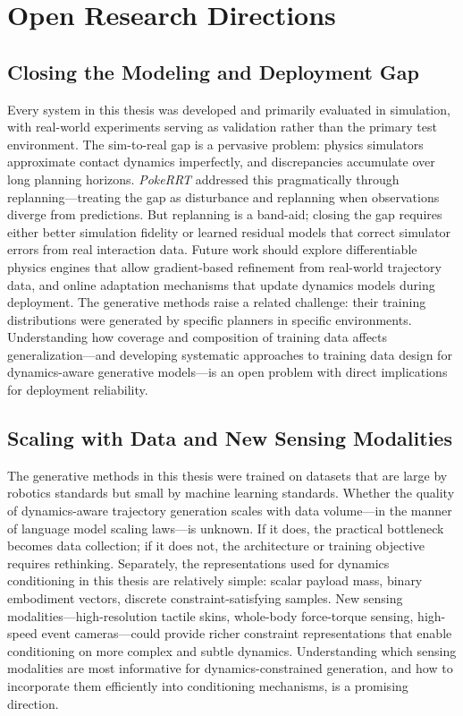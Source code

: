 
\section{Open Research Directions}
\label{sec:discussion:threads}

\subsection{Closing the Modeling and Deployment Gap}
\label{sec:discussion:modeling}

Every system in this thesis was developed and primarily evaluated in simulation, with real-world experiments serving as validation rather than the primary test environment.
The sim-to-real gap is a pervasive problem: physics simulators approximate contact dynamics imperfectly, and discrepancies accumulate over long planning horizons.
\textit{PokeRRT} addressed this pragmatically through replanning---treating the gap as disturbance and replanning when observations diverge from predictions.
But replanning is a band-aid; closing the gap requires either better simulation fidelity or learned residual models that correct simulator errors from real interaction data.
Future work should explore differentiable physics engines that allow gradient-based refinement from real-world trajectory data, and online adaptation mechanisms that update dynamics models during deployment.
The generative methods raise a related challenge: their training distributions were generated by specific planners in specific environments.
Understanding how coverage and composition of training data affects generalization---and developing systematic approaches to training data design for dynamics-aware generative models---is an open problem with direct implications for deployment reliability.

\subsection{Scaling with Data and New Sensing Modalities}
\label{sec:discussion:datascaling}

The generative methods in this thesis were trained on datasets that are large by robotics standards but small by machine learning standards.
Whether the quality of dynamics-aware trajectory generation scales with data volume---in the manner of language model scaling laws---is unknown.
If it does, the practical bottleneck becomes data collection; if it does not, the architecture or training objective requires rethinking.
Separately, the representations used for dynamics conditioning in this thesis are relatively simple: scalar payload mass, binary embodiment vectors, discrete constraint-satisfying samples.
New sensing modalities---high-resolution tactile skins, whole-body force-torque sensing, high-speed event cameras---could provide richer constraint representations that enable conditioning on more complex and subtle dynamics.
Understanding which sensing modalities are most informative for dynamics-constrained generation, and how to incorporate them efficiently into conditioning mechanisms, is a promising direction.

